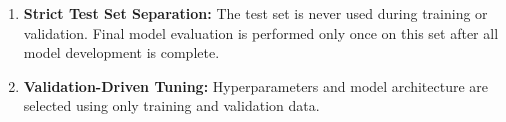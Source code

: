 \begin{enumerate}
	\item {\bf Strict Test Set Separation: } The test set is never used during training or validation. Final model evaluation is performed only once on this set after all model development is complete.
	
	\item {\bf Validation-Driven Tuning: } Hyperparameters and model architecture are selected using only training and validation data. 
%	
%
\end{enumerate}




